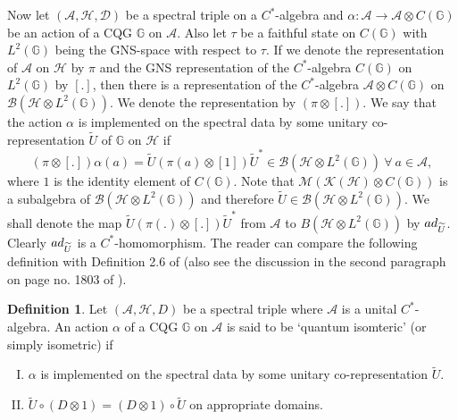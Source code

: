 \documentclass{amsart}
\theoremstyle{plain}
\theoremstyle{definition}
\newtheorem{definition}[subsection]{Definition}
\theoremstyle{remark}
\numberwithin{equation}{section}
\newcommand{\Dlt}{\Delta}
\newcommand{\cal}{\mathcal}
\newcommand{\cla}{{\cal A}}
\newcommand{\clb}{{\cal B}}
\newcommand{\cld}{{\cal D}}
\newcommand{\clh}{{\cal H}}
\newcommand{\clk}{{\cal K}}
\newcommand{\clm}{{\cal M}}
\newcommand{\raro}{\rightarrow}
\begin{document}
\indent Now let $(\cla,\clh,\cld)$ be a spectral triple on a $C^{\ast}$-algebra and $\alpha:\cla\raro\cla\otimes C(\mathbb{G})$ be an action of a CQG $\mathbb{G}$ on $\cla$. Also let $\tau$ be a faithful state on $C(\mathbb{G})$ with $L^{2}(\mathbb{G})$ being the GNS-space with respect to $\tau$. If we denote the representation of $\cla$ on $\clh$ by $\pi$ and the GNS representation of the $C^{\ast}$-algebra $C(\mathbb{G})$ on $L^{2}(\mathbb{G})$ by $[.]$, then there is a representation of the $C^{\ast}$-algebra $\cla\otimes C(\mathbb{G})$ on $\clb(\clh\otimes L^{2}(\mathbb{G}))$. We denote the representation by $(\pi\otimes [.])$. We say that the action $\alpha$ is implemented on the spectral data by some unitary co-representation $\widetilde{U}$ of $\mathbb{G}$ on $\clh$ if 
\begin{displaymath}
    (\pi\otimes [.])\alpha(a)=\widetilde{U}(\pi(a)\otimes [1])\widetilde{U}^{\ast}\in\clb(\clh\otimes L^{2}(\mathbb{G})) \ \forall \ a\in\cla,
\end{displaymath}
where $1$ is the identity element of $C(\mathbb{G})$. Note that $\clm(\clk(\clh)\otimes C(\mathbb{G}))$ is a subalgebra of $\clb(\clh\otimes L^{2}(\mathbb{G}))$ and therefore $\widetilde{U}\in \clb(\clh\otimes L^{2}(\mathbb{G}))$. We shall denote the map $\widetilde{U}(\pi(.)\otimes[.])\widetilde{U}^{\ast}$ from $\cla$ to $B(\clh\otimes L^{2}(\mathbb{G}))$ by ${\rm ad}_{\widetilde{U}}$. Clearly ${\rm ad}_{\widetilde{U}}$ is a $C^{\ast}$-homomorphism. The reader can compare the following definition with Definition 2.6 of \cite{goswami1} (also see the discussion in the second paragraph on page no. 1803 of \cite{rossi}).
\begin{definition}
\label{quantumisometricdefinition}
    Let $(\cla,\clh,D)$ be a spectral triple where $\cla$ is a unital $C^{\ast}$-algebra. An action $\alpha$ of a CQG $\mathbb{G}$ on $\cla$ is said to be `quantum isomteric' (or simply isometric) if 
    \begin{enumerate}[(I)]
    \setlength\itemsep{0.5em}
    \item $\alpha$ is implemented on the spectral data by some unitary co-representation $\widetilde{U}$.
    \item $\widetilde{U}\circ(D\otimes 1)=(D\otimes 1)\circ\widetilde{U}$ on appropriate domains.
    \end{enumerate} 
\end{definition}
\end{document}
